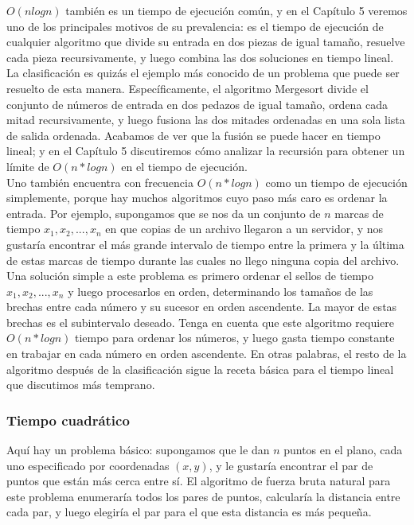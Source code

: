 \documentclass[a4paper]{article}
\begin{document}
$O(nlog n)$ también es un tiempo de ejecución común, y en el Capítulo 5 veremos uno de los principales motivos de su prevalencia: es el tiempo de ejecución de cualquier algoritmo que divide su entrada en dos piezas de igual tamaño, resuelve cada pieza recursivamente, y luego combina las dos soluciones en tiempo lineal.\\

La clasificación es quizás el ejemplo más conocido de un problema que puede ser resuelto de esta manera. Específicamente, el algoritmo Mergesort divide el conjunto de números de entrada en dos pedazos de igual tamaño, ordena cada mitad recursivamente, y luego fusiona las dos mitades ordenadas en una sola lista de salida ordenada. Acabamos de ver que la fusión se puede hacer en tiempo lineal; y en el Capítulo 5 discutiremos cómo analizar la recursión para obtener un límite de $O(n*log n)$ en el tiempo de ejecución.\\

Uno también encuentra con frecuencia $O(n*log n)$ como un tiempo de ejecución simplemente, porque hay muchos algoritmos cuyo paso más caro es ordenar la entrada. Por ejemplo, supongamos que se nos da un conjunto de $n$ marcas de tiempo $x_1, x_2,. . . , x_n$ en que copias de un archivo llegaron a un servidor, y nos gustaría encontrar el más grande intervalo de tiempo entre la primera y la última de estas marcas de tiempo durante las cuales no llego ninguna copia del archivo. Una solución simple a este problema es primero ordenar el sellos de tiempo $x_1, x_2,. . . , x_n$ y luego procesarlos en orden, determinando los tamaños de las brechas entre cada número y su sucesor en orden ascendente. La mayor de estas brechas es el subintervalo deseado. Tenga en cuenta que este algoritmo requiere $O(n*log n)$ tiempo para ordenar los números, y luego gasta tiempo constante en trabajar en cada número en orden ascendente. En otras palabras, el resto de la algoritmo después de la clasificación sigue la receta básica para el tiempo lineal que discutimos más temprano.\\

\subsubsection*{Tiempo cuadrático} 
Aquí hay un problema básico: supongamos que le dan $n$ puntos en el plano, cada uno especificado por coordenadas $(x,y)$, y le gustaría encontrar el par de puntos que están más cerca entre sí. El algoritmo de fuerza bruta natural para este problema enumeraría todos los pares de puntos, calcularía la distancia entre cada par, y luego elegiría el par para el que esta distancia es más pequeña.\\
\end{document}

